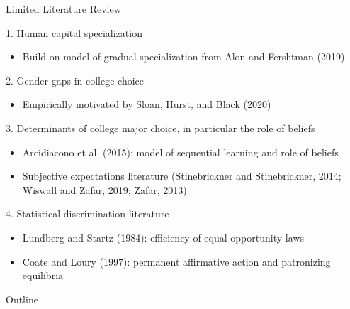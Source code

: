 \documentclass[compress, 8pt]{beamer}
\begin{document}
\begin{frame}{Limited Literature Review}

1. Human capital specialization
\begin{itemize}
    \item Build on model of gradual specialization from Alon and Fershtman (2019)
\end{itemize}

\vspace{4ex}
2. Gender gaps in college choice
\begin{itemize}
    \item Empirically motivated by Sloan, Hurst, and Black (2020)  %
\end{itemize}

\vspace{4ex}
3. Determinants of college major choice, in particular the role of beliefs
\begin{itemize}
    \item Arcidiacono et al. (2015): model of sequential learning and role of beliefs
    \item Subjective expectations literature (Stinebrickner and Stinebrickner, 2014; Wiswall and Zafar, 2019; Zafar, 2013)
\end{itemize}

\vspace{3ex}
4. Statistical discrimination literature 
\begin{itemize}
    \item Lundberg and Startz (1984): efficiency of equal opportunity laws
    \item Coate and Loury (1997): permanent affirmative action and patronizing equilibria
\end{itemize}

\end{frame}

\miniframesoff
\begin{frame}{Outline}
    \tableofcontents
\end{frame}
\miniframeson
\end{document}
